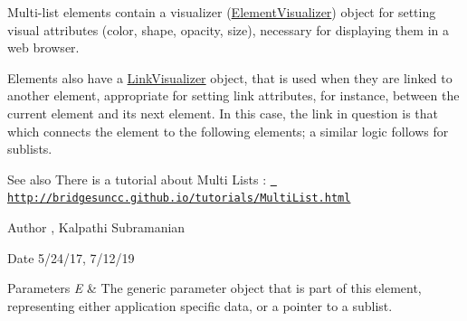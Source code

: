 Multi-\/list elements contain a visualizer (\mbox{\hyperlink{classbridges_1_1datastructure_1_1_element_visualizer}{Element\+Visualizer}}) object for setting visual attributes (color, shape, opacity, size), necessary for displaying them in a web browser.

Elements also have a \mbox{\hyperlink{classbridges_1_1datastructure_1_1_link_visualizer}{Link\+Visualizer}} object, that is used when they are linked to another element, appropriate for setting link attributes, for instance, between the current element and its next element. In this case, the link in question is that which connects the element to the following elements; a similar logic follows for sublists.

\begin{DoxySeeAlso}{See also}
There is a tutorial about Multi Lists \+: \href{http://bridgesuncc.github.io/tutorials/MultiList.html}{\texttt{ http\+://bridgesuncc.\+github.\+io/tutorials/\+Multi\+List.\+html}}
\end{DoxySeeAlso}
\begin{DoxyAuthor}{Author}
, Kalpathi Subramanian
\end{DoxyAuthor}
\begin{DoxyDate}{Date}
5/24/17, 7/12/19
\end{DoxyDate}

\begin{DoxyParams}{Parameters}
{\em E} & The generic parameter object that is part of this element, representing either application specific data, or a pointer to a sublist. \\
\hline
\end{DoxyParams}
